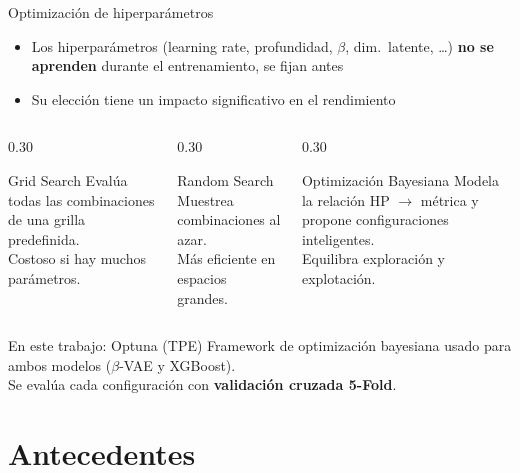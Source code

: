 \documentclass[aspectratio=169, 11pt]{beamer}
\begin{document}
\begin{frame}{Optimización de hiperparámetros}
  \begin{itemize}
    \item Los hiperparámetros (learning rate, profundidad, $\beta$, dim.\ latente, \ldots) \textbf{no se aprenden} durante el entrenamiento, se fijan antes
    \item Su elección tiene un impacto significativo en el rendimiento
  \end{itemize}

  \vspace{0.3cm}
  \begin{columns}[T]
    \begin{column}{0.30\textwidth}
      \begin{block}{\small Grid Search}
        {\scriptsize Evalúa todas las combinaciones de una grilla predefinida.\\Costoso si hay muchos parámetros.}
      \end{block}
    \end{column}
    \begin{column}{0.30\textwidth}
      \begin{block}{\small Random Search}
        {\scriptsize Muestrea combinaciones al azar.\\Más eficiente en espacios grandes.}
      \end{block}
    \end{column}
    \begin{column}{0.30\textwidth}
      \begin{block}{\small Optimización Bayesiana}
        {\scriptsize Modela la relación HP $\rightarrow$ métrica y propone configuraciones inteligentes.\\Equilibra exploración y explotación.}
      \end{block}
    \end{column}
  \end{columns}

  \vspace{0.3cm}
  \begin{block}{En este trabajo: Optuna (TPE)}
    Framework de optimización bayesiana usado para ambos modelos ($\beta$-VAE y XGBoost).\\
    Se evalúa cada configuración con \textbf{validación cruzada 5-Fold}.
  \end{block}
\end{frame}


\section{Antecedentes}
\end{document}
